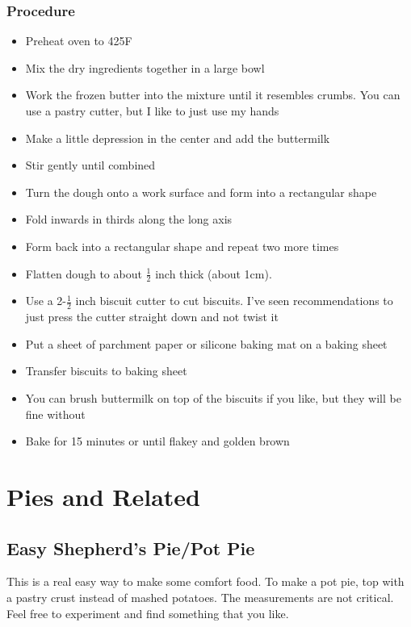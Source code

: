 \documentclass[10pt, openany]{book}
\begin{document}
\subsection{Procedure}
\begin{itemize}
  \item Preheat oven to 425\degrees{}F
  \item Mix the dry ingredients together in a large bowl
  \item Work the frozen butter into the mixture until it resembles crumbs.  You can use a pastry cutter, but I like to just use my hands
  \item Make a little depression in the center and add the buttermilk
  \item Stir gently until combined
  \item Turn the dough onto a work surface and form into a rectangular shape
  \item Fold inwards in thirds along the long axis
  \item Form back into a rectangular shape and repeat two more times
  \item Flatten dough to about $\frac{1}{2}$ inch thick (about 1cm).
  \item Use a 2-$\frac{1}{2}$ inch biscuit cutter to cut biscuits.  I've seen recommendations to just press the cutter straight down and not twist it
  \item Put a sheet of parchment paper or silicone baking mat on a baking sheet
  \item Transfer biscuits to baking sheet
  \item You can brush buttermilk on top of the biscuits if you like, but they will be fine without
  \item Bake for 15 minutes or until flakey and golden brown
\end{itemize}

\chapter{Pies and Related}

\section{Easy Shepherd's Pie/Pot Pie}
\label{pie:ShepherdsPie}
This is a real easy way to make some comfort food.  To make a pot pie, top with a pastry crust instead of mashed potatoes.  The measurements are not critical.  Feel free to experiment and find something that you like.
\end{document}
